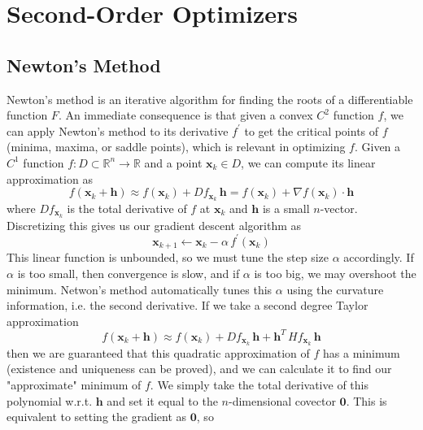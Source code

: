 \section{Second-Order Optimizers} 

  \subsection{Newton's Method}

    Newton's method is an iterative algorithm for finding the roots of a differentiable function $F$. An immediate consequence is that given a convex $C^2$ function $f$, we can apply Newton's method to its derivative $f^\prime$ to get the critical points of $f$ (minima, maxima, or saddle points), which is relevant in optimizing $f$. Given a $C^1$ function $f: D \subset \mathbb{R}^n \longrightarrow \mathbb{R}$ and a point $\mathbf{x}_k \in D$, we can compute its linear approximation as 
    \begin{equation}
      f(\mathbf{x}_k + \mathbf{h}) \approx f(\mathbf{x}_k) + D f_{\mathbf{x}_k} \, \mathbf{h} = f(\mathbf{x}_k) + \nabla f(\mathbf{x}_k) \cdot \mathbf{h}
    \end{equation}
    where $D f_{\mathbf{x}_k}$ is the total derivative of $f$ at $\mathbf{x}_k$ and $\mathbf{h}$ is a small $n$-vector. Discretizing this gives us our gradient descent algorithm as 
    \begin{equation}
      \mathbf{x}_{k+1} \gets \mathbf{x}_k - \alpha \, f^\prime(\mathbf{x}_k)
    \end{equation}
    This linear function is unbounded, so we must tune the step size $\alpha$ accordingly. If $\alpha$ is too small, then convergence is slow, and if $\alpha$ is too big, we may overshoot the minimum. Netwon's method automatically tunes this $\alpha$ using the curvature information, i.e. the second derivative. If we take a second degree Taylor approximation 
    \begin{equation}
      f(\mathbf{x}_k + \mathbf{h}) \approx f(\mathbf{x}_k) + D f_{\mathbf{x}_k} \, \mathbf{h} + \mathbf{h}^T \, H f_{\mathbf{x}_k} \, \mathbf{h}
    \end{equation}
    then we are guaranteed that this quadratic approximation of $f$ has a minimum (existence and uniqueness can be proved), and we can calculate it to find our "approximate" minimum of $f$. We simply take the total derivative of this polynomial w.r.t. $\mathbf{h}$ and set it equal to the $n$-dimensional covector $\mathbf{0}$. This is equivalent to setting the gradient as $\mathbf{0}$, so 
